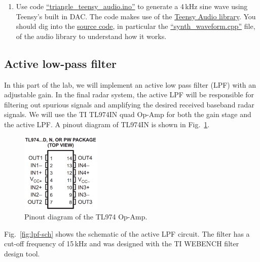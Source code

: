 \documentclass[letterpaper, 11pt]{article}
\begin{document}
\begin{enumerate}
\item Use code \href{https://github.com/ucdart/UCD-EEC134/blob/master/labs/lab1/code/triangle_teensy_audio/triangle_teensy_audio.ino}{``triangle\_teensy\_audio.ino''} to generate a 4\,kHz sine wave using Teensy's built in DAC. The code makes use of the \href{http://www.pjrc.com/teensy/td_libs_Audio.html}{Teensy Audio library}. You should dig into the \href{https://github.com/PaulStoffregen/Audio}{source code}, in particular the \href{https://github.com/PaulStoffregen/Audio/blob/master/synth_waveform.cpp}{``synth\_waveform.cpp''} file, of the audio library to understand how it works. 
\end{enumerate}

\subsection{Active low-pass filter}
\label{sec:lpf}

In this part of the lab, we will implement an active low pass filter (LPF) with an adjustable gain. In the final radar system, the active LPF will be responsible for filtering out spurious signals and amplifying the desired received baseband radar signals. We will use the TI TL974IN quad Op-Amp for both the gain stage and the active LPF. A pinout diagram of TL974IN is shown in Fig.~\ref{fig:tl974-pinout}. 

\begin{figure}[h]
	\centering
	\includegraphics[width=1.5in]{tl974-pinout}
	\caption{Pinout diagram of the TL974 Op-Amp.}
	\label{fig:tl974-pinout}
\end{figure}

Fig.~\ref{fig:lpf-sch} shows the schematic of the active LPF circuit. The filter has a cut-off frequency of 15\,kHz and was designed with the TI WEBENCH filter design tool.  



\end{document}
